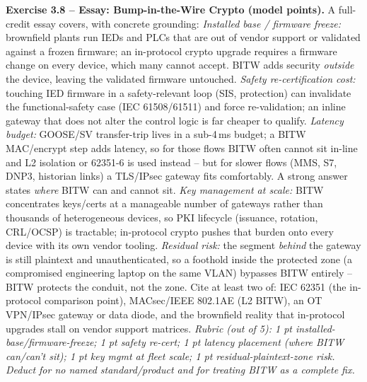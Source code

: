 \documentclass[11pt,a4paper]{article}
\begin{document}
\begin{solutionbox}
\textbf{Exercise 3.8 -- Essay: Bump-in-the-Wire Crypto (model points).}
A full-credit essay covers, with concrete grounding:
\emph{Installed base / firmware freeze:} brownfield plants run IEDs and PLCs
that are out of vendor support or validated against a frozen firmware; an
in-protocol crypto upgrade requires a firmware change on every device, which
many cannot accept. BITW adds security \emph{outside} the device, leaving
the validated firmware untouched.
\emph{Safety re-certification cost:} touching IED firmware in a
safety-relevant loop (SIS, protection) can invalidate the functional-safety
case (IEC 61508/61511) and force re-validation; an inline gateway that does
not alter the control logic is far cheaper to qualify.
\emph{Latency budget:} GOOSE/SV transfer-trip lives in a sub-4\,ms budget;
a BITW MAC/encrypt step adds latency, so for those flows BITW often cannot
sit in-line and L2 isolation or 62351-6 is used instead -- but for slower
flows (MMS, S7, DNP3, historian links) a TLS/IPsec gateway fits comfortably.
A strong answer states \emph{where} BITW can and cannot sit.
\emph{Key management at scale:} BITW concentrates keys/certs at a manageable
number of gateways rather than thousands of heterogeneous devices, so PKI
lifecycle (issuance, rotation, CRL/OCSP) is tractable; in-protocol crypto
pushes that burden onto every device with its own vendor tooling.
\emph{Residual risk:} the segment \emph{behind} the gateway is still
plaintext and unauthenticated, so a foothold inside the protected zone (a
compromised engineering laptop on the same VLAN) bypasses BITW entirely --
BITW protects the conduit, not the zone.
Cite at least two of: IEC 62351 (the in-protocol comparison point),
MACsec/IEEE 802.1AE (L2 BITW), an OT VPN/IPsec gateway or data diode, and
the brownfield reality that in-protocol upgrades stall on vendor support
matrices.
\textit{Rubric (out of 5): 1 pt installed-base/firmware-freeze; 1 pt
safety re-cert; 1 pt latency placement (where BITW can/can't sit); 1 pt key
mgmt at fleet scale; 1 pt residual-plaintext-zone risk. Deduct for no named
standard/product and for treating BITW as a complete fix.}
\end{solutionbox}
\end{document}
